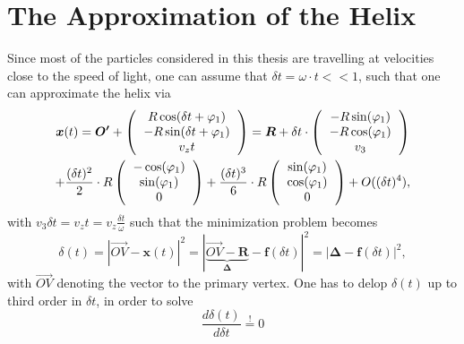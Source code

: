 
\chapter{The Approximation of the Helix} %

\label{AppendixA}
Since most of the particles considered in this thesis are travelling at velocities close to the speed of light, one can assume that $\delta t = \omega \cdot t << 1$, such that one can approximate the helix via
\begin{multline}
	\boldsymbol{x}(t) = \boldsymbol{O'} +  \left(\begin{tabular}{c}
	$R\cos(\delta t + \varphi_1) $\\ 
	$-R\sin(\delta t + \varphi_1) $\\ 
	$v_z t $
	\end{tabular} \right) = \boldsymbol{R} +  \delta t \cdot \left(\begin{tabular}{c}
	$-R\sin(\varphi_1) $\\ 
	$-R\cos(\varphi_1) $\\ 
	$v_3$
	\end{tabular}\right) \\ +\frac{(\delta t)^2}{2} \cdot R \left(\begin{tabular}{c}
	$-\cos(\varphi_1) $\\ 
	$\sin(\varphi_1) $\\ 
	$0$
	\end{tabular}\right)+\frac{(\delta t)^3}{6} \cdot R \left(\begin{tabular}{c}
	$\sin(\varphi_1) $\\ 
	$\cos(\varphi_1) $\\ 
	$0$
	\end{tabular}\right)+O((\delta t)^4),
\end{multline}
with $v_3 \delta t = v_z t = v_z \frac{\delta t}{\omega}$ such that the minimization problem becomes
\begin{equation}
	\delta(t) = |\overrightarrow{OV}-\boldsymbol{x}(t)|^2 = |\underbrace{\overrightarrow{OV}-\boldsymbol{R}}_\text{$\boldsymbol{\Delta}$}-\boldsymbol{f}(\delta t)|^2 = |\boldsymbol{\Delta}-\boldsymbol{f}(\delta t)|^2,
\end{equation}
with $\overrightarrow{OV}$ denoting the vector to the primary vertex. One has to delop $\delta(t)$ up to third order in $\delta t$, in order to solve
\begin{equation}
	\frac{d\delta(t)}{d\delta t} \stackrel{!}{=} 0
\end{equation}
